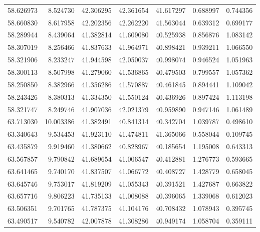\begin{tabular}{rrrrrrr}
 58.626973 &   8.524730 &         42.306295 &         42.361654 &         41.617297 &  0.688997 &  0.744356 \\
 58.660830 &   8.617958 &         42.202356 &         42.262220 &         41.563044 &  0.639312 &  0.699177 \\
 58.289944 &   8.439064 &         41.382814 &         41.609080 &         40.525938 &  0.856876 &  1.083142 \\
 58.307019 &   8.256466 &         41.837633 &         41.964971 &         40.898421 &  0.939211 &  1.066550 \\
 58.321906 &   8.233247 &         41.944598 &         42.050037 &         40.998074 &  0.946524 &  1.051963 \\
 58.300113 &   8.507998 &         41.279060 &         41.536865 &         40.479503 &  0.799557 &  1.057362 \\
 58.250850 &   8.382966 &         41.356286 &         41.570887 &         40.461845 &  0.894441 &  1.109042 \\
 58.243426 &   8.380313 &         41.334350 &         41.550124 &         40.436926 &  0.897424 &  1.113198 \\
 58.321747 &   8.249746 &         41.907036 &         42.021379 &         40.959890 &  0.947146 &  1.061489 \\
 63.713030 &  10.003386 &         41.382491 &         40.841314 &         40.342704 &  1.039787 &  0.498610 \\
 63.340643 &   9.534453 &         41.923110 &         41.474811 &         41.365066 &  0.558044 &  0.109745 \\
 63.435879 &   9.919460 &         41.380662 &         40.828967 &         40.185654 &  1.195008 &  0.643313 \\
 63.567857 &   9.790842 &         41.689654 &         41.006547 &         40.412881 &  1.276773 &  0.593665 \\
 63.641465 &   9.740170 &         41.837507 &         41.066772 &         40.408727 &  1.428779 &  0.658045 \\
 63.645746 &   9.753017 &         41.819209 &         41.055343 &         40.391521 &  1.427687 &  0.663822 \\
 63.657716 &   9.806223 &         41.735133 &         41.008088 &         40.396065 &  1.339068 &  0.612023 \\
 63.506351 &   9.701765 &         41.787375 &         41.104176 &         40.708432 &  1.078943 &  0.395745 \\
 63.490517 &   9.540782 &         42.007878 &         41.308286 &         40.949174 &  1.058704 &  0.359111 \\

\end{tabular}
